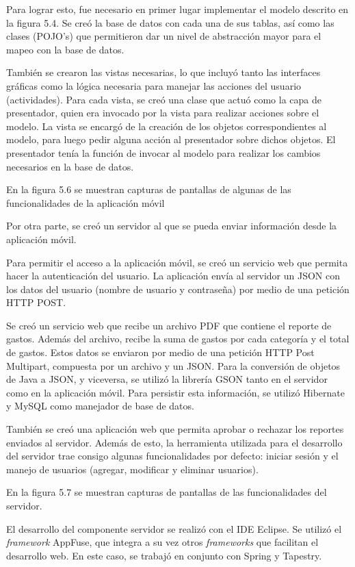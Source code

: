 Para lograr esto, fue necesario en primer lugar implementar el modelo descrito en la figura 5.4. Se creó la base de datos con cada una de sus tablas, así como las clases (POJO's) que permitieron dar un nivel de abstracción mayor para el mapeo con la base de datos.

También se crearon las vistas necesarias, lo que incluyó tanto las interfaces gráficas como la lógica necesaria para manejar las acciones del usuario (actividades). Para cada vista, se creó una clase que actuó como la capa de presentador, quien era invocado por la vista para realizar acciones sobre el modelo. La vista se encargó de la creación de los objetos correspondientes al modelo, para luego pedir alguna acción al presentador sobre dichos objetos. El presentador tenía la función de invocar al modelo para realizar los cambios necesarios en la base de datos. 

En la figura 5.6 se muestran capturas de pantallas de algunas de las funcionalidades de la aplicación móvil

Por otra parte, se creó un servidor al que se pueda enviar información desde la aplicación móvil. 

Para permitir el acceso a la aplicación móvil, se creó un servicio web que permita hacer la autenticación del usuario. La aplicación envía al servidor un JSON con los datos del usuario (nombre de usuario y contraseña) por medio de una petición HTTP POST.

Se creó un servicio web que recibe un archivo PDF que contiene el reporte de gastos. Además del archivo, recibe la suma de gastos por cada categoría y el total de gastos. Estos datos se enviaron por medio de una petición HTTP Post Multipart, compuesta por un archivo y un JSON. Para la conversión de objetos de Java a JSON, y viceversa, se utilizó la librería GSON tanto en el servidor como en la aplicación móvil. Para persistir esta información, se utilizó Hibernate y MySQL como manejador de base de datos.

También se creó una aplicación web que permita aprobar o rechazar los reportes enviados al servidor. Además de esto, la herramienta utilizada para el desarrollo del servidor trae consigo algunas funcionalidades por defecto: iniciar sesión y el manejo de usuarios (agregar, modificar y eliminar usuarios).

En la figura 5.7 se muestran capturas de pantallas de las funcionalidades del servidor.

El desarrollo del componente servidor se realizó con el IDE Eclipse. Se utilizó el \textit{framework} AppFuse, que integra a su vez otros \textit{frameworks} que facilitan el desarrollo web. En este caso, se trabajó en conjunto con Spring y Tapestry.

